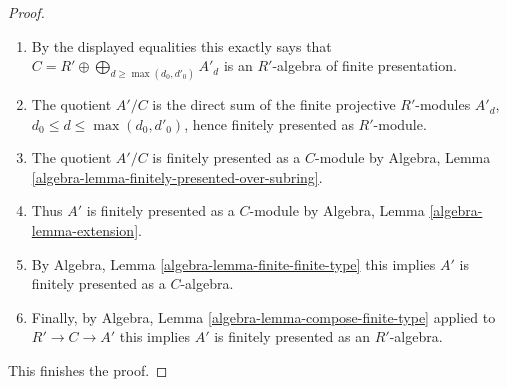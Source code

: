 \begin{proof}
\begin{enumerate}
\item[(d)] By the displayed equalities this exactly says that
$C = R' \oplus \bigoplus_{d \geq \max(d_0, d'_0)} A'_d$
is an $R'$-algebra of finite presentation.
\item[(e)] The quotient $A'/C$ is the direct sum of the finite
projective $R'$-modules $A'_d$, $d_0 \leq d \leq \max(d_0, d'_0)$,
hence finitely presented as $R'$-module.
\item[(f)] The quotient $A'/C$ is finitely presented
as a $C$-module by Algebra, Lemma
\ref{algebra-lemma-finitely-presented-over-subring}.
\item[(g)] Thus $A'$ is finitely presented as a $C$-module by
Algebra, Lemma \ref{algebra-lemma-extension}.
\item[(h)] By Algebra, Lemma \ref{algebra-lemma-finite-finite-type}
this implies $A'$ is finitely presented as a $C$-algebra.
\item[(i)] Finally, by
Algebra, Lemma \ref{algebra-lemma-compose-finite-type}
applied to $R' \to C \to A'$
this implies $A'$ is finitely presented as an $R'$-algebra.
\end{enumerate}
This finishes the proof.
\end{proof}
